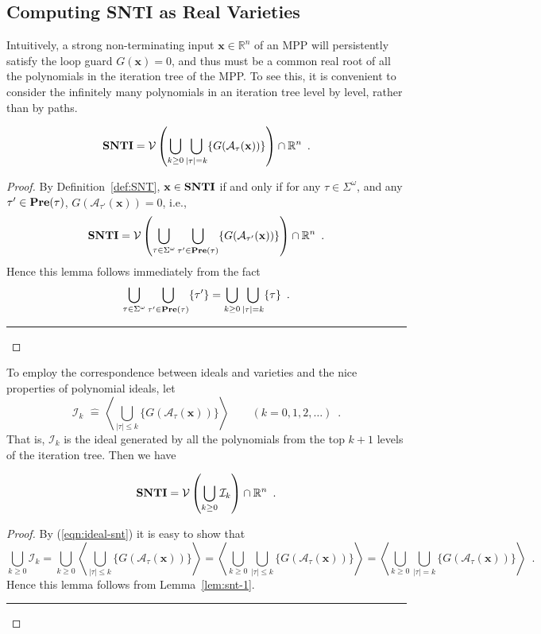 \documentclass{jssc}
\newcommand{\rulex}{\hfill\rule{1mm}{3mm}}
\newcommand{\A}{\mathcal{A}}
\newcommand{\I}{\mathcal{I}}
\newcommand{\V}{\mathcal{V}}
\newcommand{\define}{\hat{=}}
\newcommand{\xx}{\mathbf{x}}
\newcommand{\SNTI}{{\bf SNTI}}
\begin{document}
\subsection{Computing SNTI as Real Varieties}
Intuitively, a strong non-terminating input $\xx \in \mathbb{R}^n$ of an MPP will persistently satisfy the loop guard $G(\xx)=0$, and thus must be a common real root of all the polynomials in the iteration tree of the MPP. To see this, it is convenient to consider the infinitely many polynomials in an iteration tree level by level, rather than by paths.
\begin{lemma}\label{lem:snt-1}
\[
\SNTI=\V\left( \bigcup_{k \geq 0} \bigcup_{|\tau|=k} \{G(\A_{\tau}(\xx))\} \right) \cap \mathbb{R}^n \enspace .
\]
\end{lemma}
\begin{proof}
By Definition~\ref{def:SNT}, $\xx \in \SNTI$ if and only if for any $\tau \in \Sigma^{\omega}$, and any $\tau' \in {\bf Pre}(\tau)$, $G(\A_{\tau'}(\xx))=0$, i.e.,
\[
\SNTI=\V\left( \bigcup_{\tau \in \Sigma^{\omega}} \bigcup_{\tau' \in {\bf Pre}(\tau)} \{G(\A_{\tau'}(\xx))\} \right) \cap \mathbb{R}^n \enspace .
\]
Hence this lemma follows immediately from the fact
\[
\bigcup_{\tau \in \Sigma^{\omega}} \bigcup_{\tau' \in {\bf Pre}(\tau)} \{\tau'\} = \bigcup_{k \geq 0} \bigcup_{|\tau|=k} \{\tau\} \enspace .
\]
\rulex
\end{proof}

To employ the correspondence between ideals and varieties and the nice properties of polynomial ideals, let
\begin{equation}\label{eqn:ideal-snt}
\I_k \,\,\define\,\left\langle \bigcup_{|\tau| \leq k} \{G(\A_{\tau}(\xx))\} \right\rangle \qquad (k=0,1,2,\ldots) \enspace .
\end{equation}
That is, $\I_k$ is the ideal generated by all the polynomials from the top $k+1$ levels of the iteration tree. Then we have
\begin{lemma}\label{lem:snt-2}
\[
\SNTI=\V\left( \bigcup_{k \geq 0} \I_k \right) \cap \mathbb{R}^n \enspace .
\]
\end{lemma}
\begin{proof}
By (\ref{eqn:ideal-snt}) it is easy to show that
\[
\bigcup_{k \geq 0}\I_k = \bigcup_{k \geq 0} \left\langle \bigcup_{|\tau| \leq k} \{G(\A_{\tau}(\xx))\} \right\rangle = \left\langle \bigcup_{k \geq 0} \bigcup_{|\tau| \leq k} \{G(\A_{\tau}(\xx))\} \right\rangle  = \left\langle \bigcup_{k \geq 0} \bigcup_{|\tau|=k} \{G(\A_{\tau}(\xx))\} \right\rangle \enspace .
\]
Hence this lemma follows from Lemma~\ref{lem:snt-1}. \rulex
\end{proof}
\end{document}

